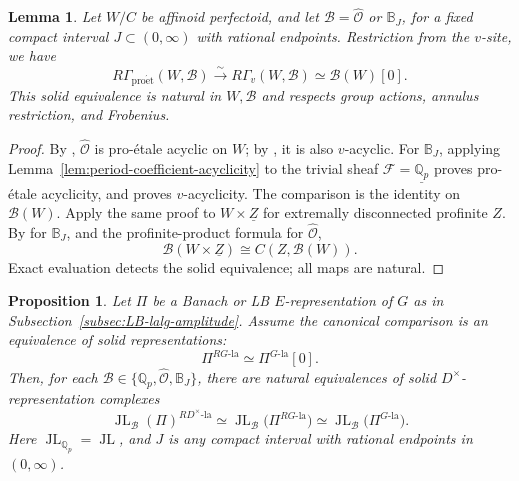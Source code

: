\documentclass[11pt]{article}
\newtheorem{proposition}[theorem]{Proposition}
\newtheorem{lemma}[theorem]{Lemma}
\theoremstyle{definition}
\newcommand{\Qp}{\mathbb Q_p}
\newcommand{\cF}{\mathcal F}
\newcommand{\la}{\mathrm{la}}
\newcommand{\proet}{\mathrm{pro\acute et}}
\newcommand{\JL}{\operatorname{JL}}
\begin{document}
\begin{lemma}
\label{lem:period-proet-v-comparison}
Let \(W/C\) be affinoid perfectoid, and let
\(\mathscr B=\widehat{\mathscr O}\) or \(\mathbb B_J\), for
a fixed compact interval \(J\subset(0,\infty)\) with rational
endpoints.  Restriction from the \(v\)-site, we have
\begin{equation*}
 R\Gamma_{\proet}(W,\mathscr B)
 \xrightarrow{\sim}R\Gamma_v(W,\mathscr B)
 \simeq\mathscr B(W)[0].
\end{equation*}
This solid equivalence is natural in \(W,\mathscr B\) and
respects group actions, annulus restriction, and Frobenius.
\end{lemma}
\begin{proof}
By \cite[Lemma~4.10]{ScholzeRigid}, \(\widehat{\mathscr O}\)
is pro-\'etale acyclic on \(W\); by
\cite[Proposition~8.8]{ScholzeDiamonds}, it is also \(v\)-acyclic.
For \(\mathbb B_J\), applying Lemma~\ref{lem:period-coefficient-acyclicity}
to the trivial sheaf \(\cF=\underline{\Qp}\) proves pro-\'etale acyclicity,
and \cite[Corollary~2.2.12(2)]{DRC} proves \(v\)-acyclicity.
The comparison is the identity on \(\mathscr B(W)\).
Apply the same proof to \(W\times\underline Z\) for extremally
disconnected profinite \(Z\).  By \cite[Corollary~4.10]{BoscoDrinfeld}
for \(\mathbb B_J\), and the profinite-product formula for
\(\widehat{\mathscr O}\),
\begin{equation*}
 \mathscr B(W\times\underline Z)
 \cong C(Z,\mathscr B(W)).
\end{equation*}
Exact evaluation detects the solid equivalence; all maps are natural.
\end{proof}


\begin{proposition}%
\label{prop:derived-la-JL-comparison}
Let \(\Pi\) be a Banach or LB \(E\)-representation of \(G\)
as in Subsection~\ref{subsec:LB-lalg-amplitude}.  Assume the canonical
comparison is an equivalence of solid representations:
\begin{equation}%
 \Pi^{RG\text{-}\la}\simeq\Pi^{G\text{-}\la}[0].
\end{equation}
Then, for each
\(\mathscr B\in\{\Qp,\widehat{\mathscr O},\mathbb B_J\}\),
there are natural equivalences of solid
\(D^\times\)-representation complexes
\begin{equation}\label{eq:derived-la-JL-comparison}
 \JL_{\mathscr B}(\Pi)^{RD^\times\text{-}\la}
 \simeq\JL_{\mathscr B}\bigl(\Pi^{RG\text{-}\la}\bigr)
 \simeq\JL_{\mathscr B}\bigl(\Pi^{G\text{-}\la}\bigr).
\end{equation}
Here \(\JL_{\Qp}=\JL\), and \(J\) is any compact interval
with rational endpoints in \((0,\infty)\).
\end{proposition}
\end{document}
